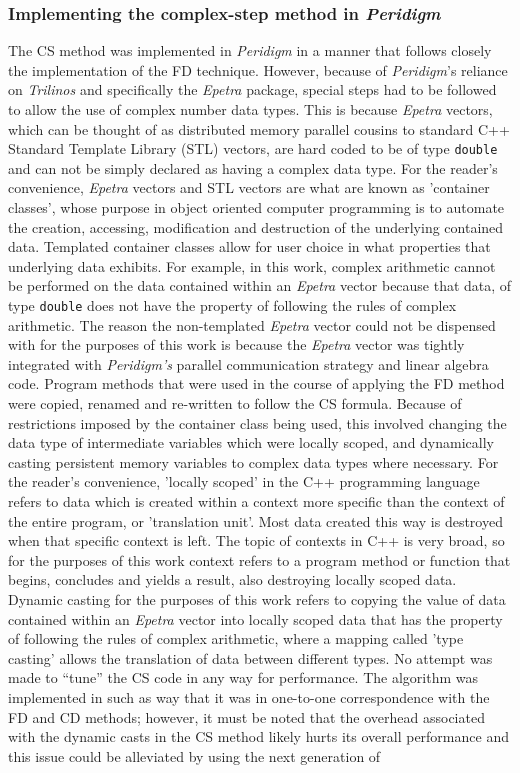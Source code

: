 \documentclass[preprint,12pt]{elsarticle}
\begin{document}
\subsubsection{Implementing the complex-step method in \emph{Peridigm}} 
\label{subsubsec:Impl}
%
The CS method was implemented in \emph{Peridigm} in a manner that follows closely the implementation of the FD technique.  However, because of \emph{Peridigm}'s reliance on \emph{Trilinos} and specifically the \emph{Epetra} package, special steps had to be followed to allow the use of complex number data types.  This is because \emph{Epetra} vectors, which can be thought of as distributed memory parallel cousins to standard C++ Standard Template Library (STL) vectors, are hard coded to be of type {\tt double} and can not be simply declared as having a complex data type.  For the reader's convenience, \emph{Epetra} vectors and STL vectors are what are known as 'container classes', whose purpose in object oriented computer programming is to automate the creation, accessing, modification and destruction of the underlying contained data. Templated container classes allow for user choice in what properties that underlying data exhibits.  For example, in this work, complex arithmetic cannot be performed on the data contained within an \emph{Epetra} vector because that data, of type {\tt double} does not have the property of following the rules of complex arithmetic. The reason the non-templated \emph{Epetra} vector could not be dispensed with for the purposes of this work is because the \emph{Epetra} vector was tightly integrated with \emph{Peridigm's} parallel communication strategy and linear algebra code. Program methods that were used in the course of applying the FD method were copied, renamed and re-written to follow the CS formula.  Because of restrictions imposed by the container class being used, this involved changing the data type of intermediate variables which were locally scoped, and dynamically casting persistent memory variables to complex data types where necessary. For the reader's convenience, 'locally scoped' in the C++ programming language refers to data which is created within a context more specific than the context of the entire program, or 'translation unit'.  Most data created this way is destroyed when that specific context is left. The topic of contexts in C++ is very broad, so for the purposes of this work context refers to a program method or function that begins, concludes and yields a result, also destroying locally scoped data. Dynamic casting for the purposes of this work refers to copying the value of data contained within an \emph{Epetra} vector into locally scoped data that has the property of following the rules of complex arithmetic, where a mapping called 'type casting' allows the translation of data between different types. No attempt was made to ``tune'' the CS code in any way for performance. The algorithm  was implemented in such as way that it was in one-to-one correspondence with the FD and CD methods; however, it must be noted that the overhead associated with the dynamic casts in the CS method likely hurts its overall performance and this issue could be alleviated by using the next generation of 
\end{document}
